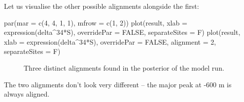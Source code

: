 \documentclass[
  letterpaper,
  DIV=11,
  numbers=noendperiod]{scrartcl}
\newenvironment{Shaded}{\begin{snugshade}}{\end{snugshade}}
\newcommand{\AttributeTok}[1]{\textcolor[rgb]{0.40,0.45,0.13}{#1}}
\newcommand{\ConstantTok}[1]{\textcolor[rgb]{0.56,0.35,0.01}{#1}}
\newcommand{\DecValTok}[1]{\textcolor[rgb]{0.68,0.00,0.00}{#1}}
\newcommand{\FunctionTok}[1]{\textcolor[rgb]{0.28,0.35,0.67}{#1}}
\newcommand{\NormalTok}[1]{\textcolor[rgb]{0.00,0.23,0.31}{#1}}
\newcommand{\SpecialCharTok}[1]{\textcolor[rgb]{0.37,0.37,0.37}{#1}}
\begin{document}
Let us visualise the other possible alignments alongside the first:

\begin{Shaded}
\begin{Highlighting}[]
\FunctionTok{par}\NormalTok{(}\AttributeTok{mar =} \FunctionTok{c}\NormalTok{(}\DecValTok{4}\NormalTok{, }\DecValTok{4}\NormalTok{, }\DecValTok{1}\NormalTok{, }\DecValTok{1}\NormalTok{), }\AttributeTok{mfrow =} \FunctionTok{c}\NormalTok{(}\DecValTok{1}\NormalTok{, }\DecValTok{2}\NormalTok{))}
\FunctionTok{plot}\NormalTok{(result, }\AttributeTok{xlab =} \FunctionTok{expression}\NormalTok{(delta}\SpecialCharTok{\^{}}\DecValTok{34}\SpecialCharTok{*}\NormalTok{S), }\AttributeTok{overridePar =} \ConstantTok{FALSE}\NormalTok{, }\AttributeTok{separateSites =}\NormalTok{ F)}
\FunctionTok{plot}\NormalTok{(result, }\AttributeTok{xlab =} \FunctionTok{expression}\NormalTok{(delta}\SpecialCharTok{\^{}}\DecValTok{34}\SpecialCharTok{*}\NormalTok{S), }\AttributeTok{overridePar =} \ConstantTok{FALSE}\NormalTok{, }\AttributeTok{alignment =} \DecValTok{2}\NormalTok{, }\AttributeTok{separateSites =}\NormalTok{ F)}
\end{Highlighting}
\end{Shaded}

\begin{figure}[H]


\caption{\label{fig-7}Three distinct alignments found in the posterior
of the model run.}

\end{figure}%

The two alignments don't look very different -- the major peak at -600 m
is always aligned.
\end{document}
